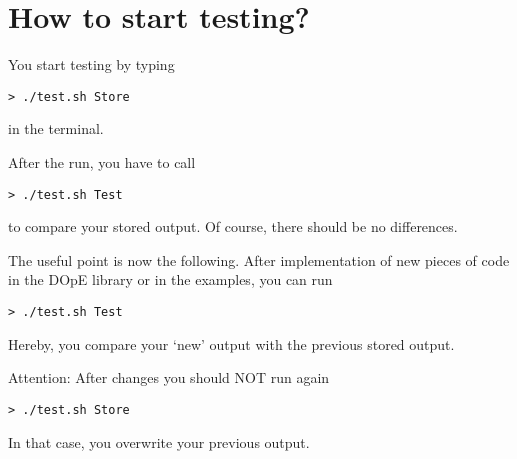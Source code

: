 \section{How to start testing?}
You start testing by typing 
\begin{verbatim}
> ./test.sh Store
\end{verbatim}
in the terminal.

After the run, you have to call 
\begin{verbatim}
> ./test.sh Test
\end{verbatim}
to compare your stored output. Of course, there should be no differences.

The useful point is now the following. After implementation of 
new pieces of code in the DOpE library or in the examples, you can
run 
\begin{verbatim}
> ./test.sh Test
\end{verbatim}
Hereby, you compare your `new' output with the previous stored output.

Attention: After changes you should NOT run again
\begin{verbatim}
> ./test.sh Store
\end{verbatim}
In that case, you overwrite your previous output.
